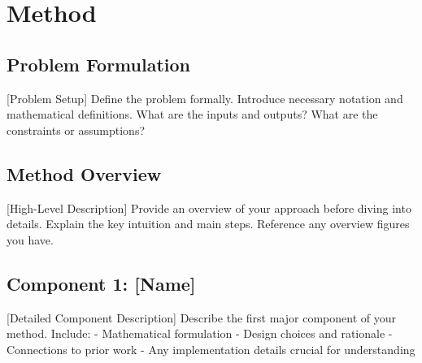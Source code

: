 
\section{Method}
\label{sec:method}

\subsection{Problem Formulation}
\label{sec:formulation}

[Problem Setup] Define the problem formally. Introduce necessary notation and mathematical definitions. What are the inputs and outputs? What are the constraints or assumptions?


\subsection{Method Overview}
\label{sec:method-overview}

[High-Level Description] Provide an overview of your approach before diving into details. Explain the key intuition and main steps. Reference any overview figures you have.


\subsection{Component 1: [Name]}
\label{sec:component1}

[Detailed Component Description] Describe the first major component of your method. Include:
- Mathematical formulation
- Design choices and rationale
- Connections to prior work
- Any implementation details crucial for understanding

